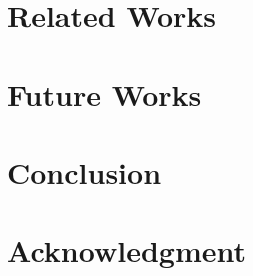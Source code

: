 \documentclass[conference]{IEEEtran}
\begin{document}
\section{Related Works}





\section{Future Works}

\section{Conclusion}

\section*{Acknowledgment}
\nocite{*}

\begin{thebibliography}{00}

\end{thebibliography}
\end{document}
